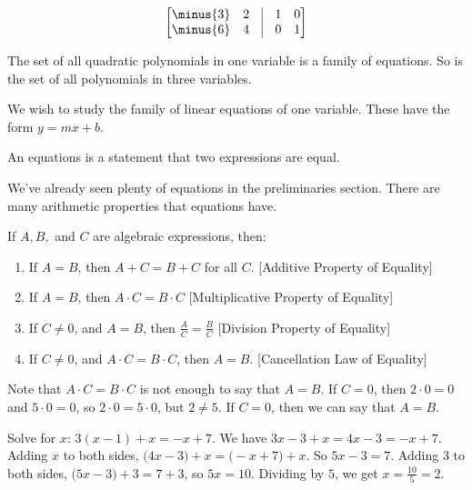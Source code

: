 \documentclass[crop=false,class=book,oneside]{standalone}                      %
\begin{document}
        \begin{equation}
            \begin{bmatrix}
                \minus{3}&2&\vline&1&0\\
                \minus{6}&4&\vline&0&1
            \end{bmatrix}
        \end{equation}
        \begin{example}
            The set of all quadratic polynomials in one variable is a family
            of equations. So is the set of all polynomials in three variables.
        \end{example}
        We wish to study the family of linear equations of one variable. These have the form $y=mx+b$.
        \begin{definition}
        An equations is a statement that two expressions are equal.
        \end{definition}
        We've already seen plenty of equations in the preliminaries section. There are many arithmetic properties that equations have.
        \begin{properties}
        If $A,B,$ and $C$ are algebraic expressions, then:
        \begin{enumerate}
        \item If $A=B$, then $A+C=B+C$ for all $C$. \hfill [Additive Property of Equality]
        \item If $A=B$, then $A\cdot C = B\cdot C$ \hfill [Multiplicative Property of Equality]
        \item If $C \ne 0$, and $A=B$, then $\frac{A}{C} = \frac{B}{C}$ \hfill [Division Property of Equality]
        \item If $C\ne 0$, and $A\cdot C = B\cdot C$, then $A=B$. \hfill [Cancellation Law of Equality]
        \end{enumerate}
        \end{properties}
        \begin{remark}
        Note that $A\cdot C = B\cdot C$ is not enough to say that $A=B$. If $C = 0$, then $2\cdot 0 = 0$ and $5\cdot 0 = 0$, so $2\cdot 0 = 5\cdot 0$, but $2\ne 5$. If $C = 0$, then we can say that $A=B$.
        \end{remark}
        \begin{example}
        Solve for $x$: $3(x-1) +x = -x+7$. We have $3x-3+x = 4x-3 = -x+7$. Adding $x$ to both sides, $\big(4x-3)+x = \big(-x+7)+x$. So $5x-3 = 7$. Adding $3$ to both sides, $\big(5x-3\big)+3 = 7+3$, so $5x = 10$. Dividing by $5$, we get $x = \frac{10}{5} = 2$.
        \end{example}
\end{document}
